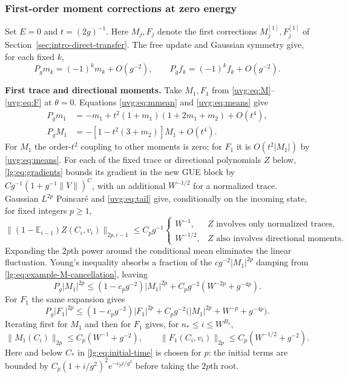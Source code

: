 \documentclass[11pt]{article}
\numberwithin{equation}{section}
\theoremstyle{remark}
\newcommand{\E}{\mathbb E}
\begin{document}
\subsubsection{First-order moment corrections at zero energy}
\label{lg:sec:state-estimates}
\label{lg:sec:concrete-Q}

Set $E=0$ and $t=(2g)^{-1}$. Here $M_j,F_j$ denote the
first corrections $M_j^{[1]},F_j^{[1]}$ of Section~\ref{sec:intro-direct-transfer}.
The free update and Gaussian symmetry give, for each fixed $k$,
\begin{equation}\label{lg:eq:example-leading-updates}
 P_gm_k=(-1)^km_k+O(g^{-2}),\qquad P_gf_k=(-1)^kf_k+O(g^{-2}).
\end{equation}

\noindent\textbf{First trace and directional moments.}
Take $M_1,F_1$ from \eqref{uvg:eq:M}--\eqref{uvg:eq:F} at $\theta=0$.
Equations \eqref{uvg:eq:mmean} and \eqref{uvg:eq:means} give
\begin{align}
 P_gm_1&=-m_1+t^2(1+m_1)(1+2m_1+m_2)+O(t^4),
 \label{lg:eq:example-raw-m}\\
 P_gM_1&=-[1-t^2(3+m_2)]M_1+O(t^4).
 \label{lg:eq:example-M-cancellation}
\end{align}
For $M_1$ the order-$t^2$ coupling to other moments is zero; for $F_1$
it is $O(t^2|M_1|)$ by \eqref{uvg:eq:means}.
For each of the fixed trace or directional polynomials $Z$ below,
\eqref{lg:eq:gradients} bounds its gradient in the new GUE block by
$C g^{-1}(1+g^{-1}\|V\|)^C$, with an additional $W^{-1/2}$ for a
normalized trace. Gaussian $L^{2p}$ Poincar\'e and \eqref{uvg:eq:tail}
give, conditionally on the incoming state, for fixed integers $p\ge1$,
\begin{equation}\label{lg:eq:example-fluctuations}
 \|(1-\E_{i-1})Z(C_i,v_i)\|_{2p,i-1}\le C_pg^{-1}
 \begin{cases}
  W^{-1},& Z\text{ involves only normalized traces},\\
  W^{-1/2},& Z\text{ also involves directional moments}.
 \end{cases}
\end{equation}
Expanding the $2p$th power around the conditional mean eliminates the
linear fluctuation. Young's inequality absorbs a fraction of the
$cg^{-2}|M_1|^{2p}$ damping from \eqref{lg:eq:example-M-cancellation},
leaving
\begin{equation}\label{lg:eq:example-moment-M}
 P_g|M_1|^{2p}\le(1-c_pg^{-2})|M_1|^{2p}
            +C_pg^{-2}(W^{-2p}+g^{-4p}).
\end{equation}
For $F_1$ the same expansion gives
\begin{equation}\label{lg:eq:example-moment-F}
 P_g|F_1|^{2p}\le(1-c_pg^{-2})|F_1|^{2p}
  +C_pg^{-2}\bigl(|M_1|^{2p}+W^{-p}+g^{-4p}\bigr).
\end{equation}
Iterating first for $M_1$ and then for $F_1$ gives, for $n_*\le i\le W^{B_1}$,
\[
 \|M_1(C_i)\|_{2p}\le C_p(W^{-1}+g^{-2}),\qquad
 \|F_1(C_i,v_i)\|_{2p}\le C_p(W^{-1/2}+g^{-2}).
\]
Here and below $C_*$ in \eqref{lg:eq:initial-time} is chosen for $p$:
the initial terms are bounded by $C_p(1+i/g^2)^2e^{-c_pi/g^2}$ before
taking the $2p$th root.
\end{document}
